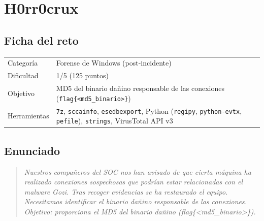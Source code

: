 \documentclass[11pt,a4paper]{article}
\begin{document}
\clearpage
\section{H0rr0crux}

\subsection{Ficha del reto}
\begin{tabularx}{\linewidth}{@{}lX@{}}
\toprule
Categoría & Forense de Windows (post-incidente) \\
Dificultad & 1/5 (125 puntos) \\
Objetivo & MD5 del binario dañino responsable de las conexiones (\texttt{flag\{<md5\_binario>\}}) \\
Herramientas & \texttt{7z}, \texttt{sccainfo}, \texttt{esedbexport}, Python (\texttt{regipy}, \texttt{python-evtx},
  \texttt{pefile}), \texttt{strings}, VirusTotal API v3 \\
\bottomrule
\end{tabularx}

\subsection{Enunciado}
\begin{quote}\itshape
Nuestros compañeros del SOC nos han avisado de que cierta máquina ha realizado conexiones sospechosas que podrían
estar relacionadas con el malware Gozi. Tras recoger evidencias se ha restaurado el equipo. Necesitamos identificar el
binario dañino responsable de las conexiones. Objetivo: proporciona el MD5 del binario dañino (flag\{<md5\_binario>\}).
\end{quote}
\end{document}
